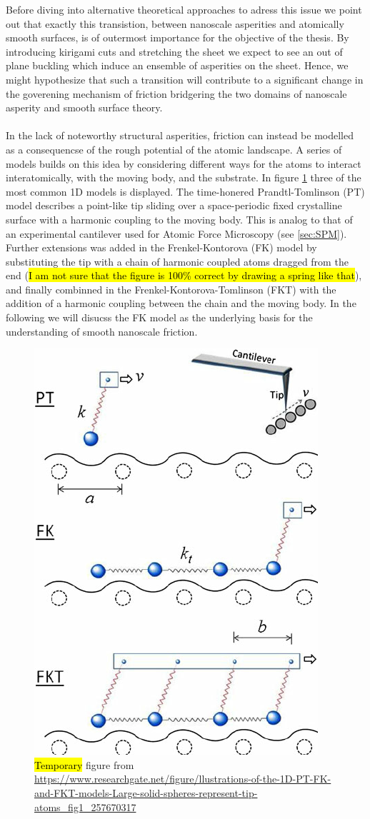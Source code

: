 Before diving into alternative theoretical approaches to adress this issue we point out that exactly this transistion, between nanoscale asperities and atomically smooth surfaces, is of outermost importance for the objective of the thesis. By introducing kirigami cuts and stretching the sheet we expect to see an out of plane buckling which induce an ensemble of asperities on the sheet. Hence, we might hypothesize that such a transition will contribute to a significant change in the goverening mechanism of friction bridgering the two domains of nanoscale asperity and smooth surface theory. 
\\
\\
In the lack of noteworthy structural asperities, friction can instead be
modelled as a consequencse of the rough potential of the atomic landscape. A
series of models builds on this idea by considering different ways for the atoms
to interact interatomically, with the moving body, and the substrate. In figure
\cref{fig:PT_FK_FKT} three of the most common 1D models is displayed. The
time-honered Prandtl-Tomlinson (PT) model describes a point-like tip sliding
over a space-periodic fixed crystalline surface with a harmonic coupling to the
moving body. This is analog to that of an experimental cantilever used
for Atomic Force Microscopy (see \cref{sec:SPM}). Further extensions was
added in the Frenkel-Kontorova (FK) model by substituting the tip with a chain
of harmonic coupled atoms dragged from the end (\hl{I am not sure that the figure is 100\% correct by drawing a spring like that}), and finally combinned
in the Frenkel-Kontorova-Tomlinson (FKT) with the addition of a harmonic
coupling between the chain and the moving body. In the following we will disucss the FK model as the underlying basis for the understanding of smooth nanoscale friction.

\begin{figure}[H]
  \centering
  \includegraphics[width=0.4\linewidth]{figures/theory/PT_FK_FKT.png}
  \caption{\hl{Temporary} figure from \url{https://www.researchgate.net/figure/llustrations-of-the-1D-PT-FK-and-FKT-models-Large-solid-spheres-represent-tip-atoms_fig1_257670317}}
  \label{fig:PT_FK_FKT}
\end{figure}





